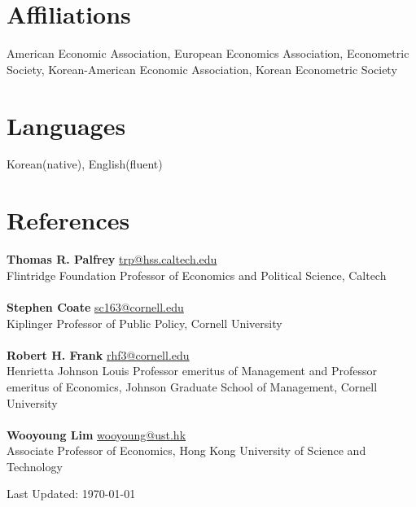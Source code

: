 \documentclass[margin, a4paper]{res}
\begin{document}
\begin{resume}
\section{Affiliations} American Economic Association, European Economics Association, Econometric Society, Korean-American Economic Association, Korean Econometric Society

\section{Languages} Korean(native), English(fluent)

\section{References} \textbf{Thomas R. Palfrey} \href{mailto:trp@hss.caltech.edu}{trp@hss.caltech.edu}\\
Flintridge Foundation Professor of Economics and Political Science, Caltech\\\\
\textbf{Stephen Coate} \href{mailto:sc163@cornell.edu}{sc163@cornell.edu}\\
Kiplinger Professor of Public Policy, Cornell University\\\\
\textbf{Robert H. Frank} \href{mailto:rhf3@cornell.edu}{rhf3@cornell.edu}\\
Henrietta Johnson Louis Professor emeritus of Management and Professor emeritus of Economics, Johnson Graduate School of Management, Cornell University\\\\
\textbf{Wooyoung Lim} \href{mailto:wooyoung@ust.hk}{wooyoung@ust.hk}\\
Associate Professor of Economics, Hong Kong University of Science and Technology
\begin{flushright}
Last Updated: \today
\end{flushright}
\end{resume} 
\end{document}
